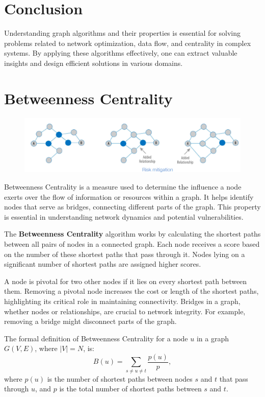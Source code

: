 \section{Conclusion}

Understanding graph algorithms and their properties is essential for solving problems related to network optimization, data flow, and centrality in complex systems. By applying these algorithms effectively, one can extract valuable insights and design efficient solutions in various domains.

\section{Betweenness Centrality}
\begin{figure}[h!]
    \centering
    \includegraphics[width=0.75\linewidth]{immagini/betcentr.png}
\end{figure}
Betweenness Centrality is a measure used to determine the influence a node exerts over the flow of information or resources within a graph. It helps identify nodes that serve as bridges, connecting different parts of the graph. This property is essential in understanding network dynamics and potential vulnerabilities.

The \textbf{Betweenness Centrality } algorithm works by calculating the shortest paths between all pairs of nodes in a connected graph. Each node receives a score based on the number of these shortest paths that pass through it. Nodes lying on a significant number of shortest paths are assigned higher scores.

A node is pivotal for two other nodes if it lies on every shortest path between them. Removing a pivotal node increases the cost or length of the shortest paths, highlighting its critical role in maintaining connectivity. Bridges in a graph, whether nodes or relationships, are crucial to network integrity. For example, removing a bridge might disconnect parts of the graph.

The formal definition of Betweenness Centrality for a node \( u \) in a graph \( G(V,E) \), where \( |V| = N \), is:
\[B(u) = \sum_{s \neq u \neq t} \frac{p(u)}{p},\]
where \( p(u) \) is the number of shortest paths between nodes \( s \) and \( t \) that pass through \( u \), and \( p \) is the total number of shortest paths between \( s \) and \( t \).


